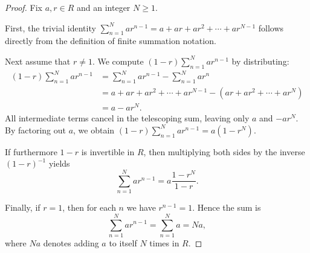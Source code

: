 \begin{proof}
    Fix $a, r \in R$ and an integer $N \geq 1$.

    First, the trivial identity $\sum_{n=1}^N ar^{n-1} = a + ar + ar^2 + \cdots + ar^{N-1}$ follows directly from the definition of finite summation notation.

    Next assume that $r \neq 1$. We compute $(1-r)\sum_{n=1}^N ar^{n-1}$ by distributing:
    \begin{align*}
        (1-r)\sum_{n=1}^N ar^{n-1} &= \sum_{n=1}^N ar^{n-1} - \sum_{n=1}^N ar^n \\
        &= a + ar + ar^2 + \cdots + ar^{N-1} - (ar + ar^2 + \cdots + ar^N) \\
        &= a - ar^N.
    \end{align*}
    All intermediate terms cancel in the telescoping sum, leaving only $a$ and $-ar^N$. By factoring out $a$, we obtain $(1-r)\sum_{n=1}^N ar^{n-1} = a(1 - r^N)$.

    If furthermore $1-r$ is invertible in $R$, then multiplying both sides by the inverse $(1-r)^{-1}$ yields
    $$\sum_{n=1}^N ar^{n-1} = a \frac{1-r^N}{1-r}.$$

    Finally, if $r = 1$, then for each $n$ we have $r^{n-1} = 1$. Hence the sum is
    $$\sum_{n=1}^N ar^{n-1} = \sum_{n=1}^N a = Na,$$
    where $Na$ denotes adding $a$ to itself $N$ times in $R$.
\end{proof}
